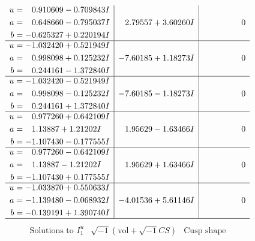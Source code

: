 \documentclass[1p]{elsarticle_modified}
\theoremstyle{definition}
\newcommand{\I}{\sqrt{-1}}
\begin{document}
$$\begin{array}{c|c|c}
\begin{aligned}
u &= \phantom{-}0.910609 - 0.709843 I \\
a &= \phantom{-}0.648660 - 0.795037 I \\
b &= -0.625327 + 0.220194 I\end{aligned}
 & \phantom{-}2.79557 + 3.60260 I & \phantom{-0.000000 } 0 \\ \hline\begin{aligned}
u &= -1.032420 + 0.521949 I \\
a &= \phantom{-}0.998098 + 0.125232 I \\
b &= \phantom{-}0.244161 - 1.372840 I\end{aligned}
 & -7.60185 + 1.18273 I & \phantom{-0.000000 } 0 \\ \hline\begin{aligned}
u &= -1.032420 - 0.521949 I \\
a &= \phantom{-}0.998098 - 0.125232 I \\
b &= \phantom{-}0.244161 + 1.372840 I\end{aligned}
 & -7.60185 - 1.18273 I & \phantom{-0.000000 } 0 \\ \hline\begin{aligned}
u &= \phantom{-}0.977260 + 0.642109 I \\
a &= \phantom{-}1.13887 + 1.21202 I \\
b &= -1.107430 - 0.177555 I\end{aligned}
 & \phantom{-}1.95629 - 1.63466 I & \phantom{-0.000000 } 0 \\ \hline\begin{aligned}
u &= \phantom{-}0.977260 - 0.642109 I \\
a &= \phantom{-}1.13887 - 1.21202 I \\
b &= -1.107430 + 0.177555 I\end{aligned}
 & \phantom{-}1.95629 + 1.63466 I & \phantom{-0.000000 } 0 \\ \hline\begin{aligned}
u &= -1.033870 + 0.550633 I \\
a &= -1.139480 - 0.068932 I \\
b &= -0.139191 + 1.390740 I\end{aligned}
 & -4.01536 + 5.61146 I & \phantom{-0.000000 } 0\\
 \hline 
 \end{array}$$\newpage$$\begin{array}{c|c|c}  
\text{Solutions to }I^u_{1}& \I (\text{vol} + \sqrt{-1}CS) & \text{Cusp shape}\\
 \hline 
\begin{aligned}

\end{aligned}
\end{array}$$
\end{document}
